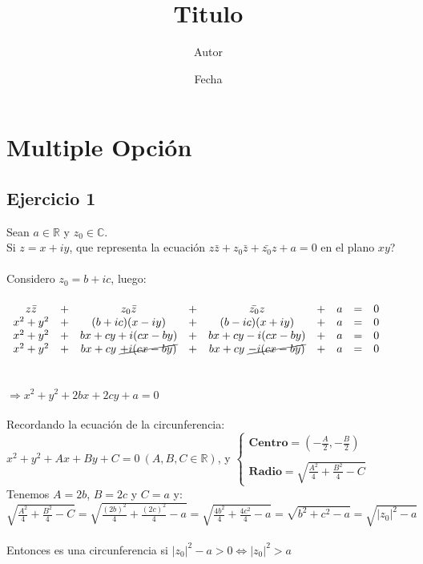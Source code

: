 \documentclass[a4paper,10pt]{article}
\title{Titulo}
\author{Autor}
\date{Fecha}
\newcommand{\dstr}[1]{\mathbb{#1}}
\newcommand{\RR}{\dstr{R}}
\newcommand{\CC}{\dstr{C}}
\newcommand{\bd}[1]{\mathbf{#1}}
\begin{document}
\section*{Multiple Opción}
\subsection*{Ejercicio 1}
Sean $a \in \RR$ y $z_0 \in \CC$.\\
Si $z=x+iy$, que representa la ecuación $z\bar{z} + z_0 \bar{z} + \bar{z_0} z + a = 0$ en el plano $xy$?\\
 \\
Considero $z_0 = b + ic$, luego:\\\\
$\begin{array}{ccccccccc}
z\bar{z} & + & z_0 \bar{z} & + & \bar{z_0} z & + & a & = & 0 \\
x^2 + y^2 & + & (b+ic)(x-iy) & + & (b-ic)(x+iy) & + & a & = & 0 \\
x^2 + y^2 & + & bx + cy + i(cx - by) & + & bx + cy - i(cx - by) & + & a & = & 0\\
x^2 + y^2 & + & bx + cy\ \cancel{+ i(cx - by)} & + & bx + cy\ \cancel{- i(cx - by)} & + & a & = & 0
\end{array}$\\\\\\
$\Rightarrow x^2 + y^2 + 2bx + 2cy + a = 0$\\\\
Recordando la ecuación de la circunferencia:\\ 
$x^2 + y^2 + Ax + By + C = 0\ (A,B,C \in \RR)$, 
y $\left\{ \begin{array}{l}
  \displaystyle \bd{Centro} = \left(-\frac{A}{2}, -\frac{B}{2} \right)  \\
   \\
   \displaystyle \bd{Radio} = \sqrt{\frac{A^2}{4} + \frac{B^2}{4} - C}
  \end{array} \right.$\\
  Tenemos $A = 2b$, $B = 2c$ y $C = a$ y:\\
  $\displaystyle \sqrt{\frac{A^2}{4} + \frac{B^2}{4} - C} = \sqrt{\frac{{(2b)}^2}{4} + \frac{{(2c)}^2}{4} - a} = \sqrt{\frac{4b^2}{4} + \frac{4c^2}{4} - a} = \sqrt{b^2 + c^2 - a} = \sqrt{{|z_0|}^2 - a}$\\\\
Entonces es una circunferencia si ${|z_0|}^2 - a > 0 \Leftrightarrow {|z_0|}^2 > a$
\end{document}

